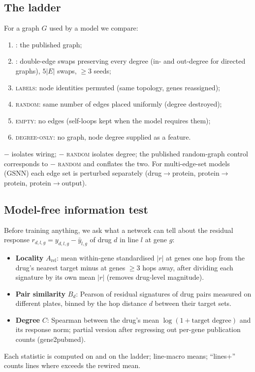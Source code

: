 \subsection{The ladder}
\label{sec:ladder}
For a graph $G$ used by a model we compare:
\begin{enumerate}
  \item \real: the published graph;
  \item \rewired: double-edge swaps preserving every degree (in- and out-degree for directed graphs),
        $5|E|$ swaps, $\geq 3$ seeds;
  \item \textsc{labels}: node identities permuted (same topology, genes reassigned);
  \item \textsc{random}: same number of edges placed uniformly (degree destroyed);
  \item \textsc{empty}: no edges (self-loops kept when the model requires them);
  \item \textsc{degree-only}: no graph, node degree supplied as a feature.
\end{enumerate}
\real{} $-$ \rewired{} isolates wiring; \rewired{} $-$ \textsc{random} isolates degree;
the published random-graph control corresponds to \real{} $-$ \textsc{random} and conflates the two.
For multi-edge-set models (GSNN) each edge set is perturbed separately
(drug$\to$protein, protein$\to$protein, protein$\to$output). 

\subsection{Model-free information test}
\label{sec:infotest}
Before training anything, we ask what a network can tell about the residual response
$r_{d,l,g} = y_{d,l,g} - \bar y_{l,g}$ of drug $d$ in line $l$ at gene $g$:
\begin{itemize}
  \item \textbf{Locality} $A_{\mathrm{rel}}$: mean within-gene standardised $|r|$ at genes one hop from the drug's
        nearest target minus at genes $\geq 3$ hops away, after dividing each signature by its own mean
        $|r|$ (removes drug-level magnitude).
  \item \textbf{Pair similarity} $B_{d}$: Pearson of residual signatures of drug pairs measured on different
        plates, binned by the hop distance $d$ between their target sets.
  \item \textbf{Degree} $C$: Spearman between the drug's mean $\log(1+\text{target degree})$ and its
        response norm; partial version after regressing out per-gene publication counts (gene2pubmed).
\end{itemize}
Each statistic is computed on \real{} and on the ladder; line-macro means; ``lines+'' counts lines
where \real{} exceeds the rewired mean. 

